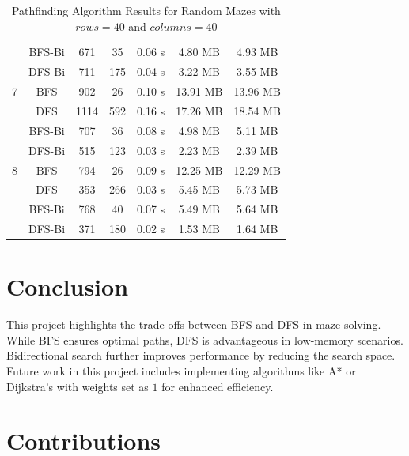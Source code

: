 \documentclass[final, journal, 11pt]{report}
\begin{document}
\begin{table}[!htbp]
\begin{tabular}{@{}ccccccc@{}}
	  & BFS-Bi    & 671  & 35   & 0.06 s & 4.80 MB  & 4.93 MB  \\
	  & DFS-Bi    & 711  & 175  & 0.04 s & 3.22 MB  & 3.55 MB  \\ \midrule
	7 & BFS       & 902  & 26   & 0.10 s & 13.91 MB & 13.96 MB \\
	  & DFS       & 1114 & 592  & 0.16 s & 17.26 MB & 18.54 MB \\
	  & BFS-Bi    & 707  & 36   & 0.08 s & 4.98 MB  & 5.11 MB  \\
	  & DFS-Bi    & 515  & 123  & 0.03 s & 2.23 MB  & 2.39 MB  \\ \midrule
	8 & BFS       & 794  & 26   & 0.09 s & 12.25 MB & 12.29 MB \\
	  & DFS       & 353  & 266  & 0.03 s & 5.45 MB  & 5.73 MB  \\
	  & BFS-Bi    & 768  & 40   & 0.07 s & 5.49 MB  & 5.64 MB  \\
	  & DFS-Bi    & 371  & 180  & 0.02 s & 1.53 MB  & 1.64 MB  \\ \bottomrule
	\end{tabular}
	\caption{Pathfinding Algorithm Results for Random Mazes with $rows = 40$ and $columns = 40$}
	\end{table}
	
	\section*{Conclusion}
	This project highlights the trade-offs between BFS and DFS in maze solving. While BFS ensures optimal paths, DFS is advantageous in low-memory scenarios. Bidirectional search further improves performance by reducing the search space. Future work in this project includes implementing algorithms like A* or Dijkstra's with weights set as $1$ for enhanced efficiency.
	
	\section*{Contributions}
	\lipsum[2-4]
	
	\nocite{*}
	\printbibliography
\end{document}
